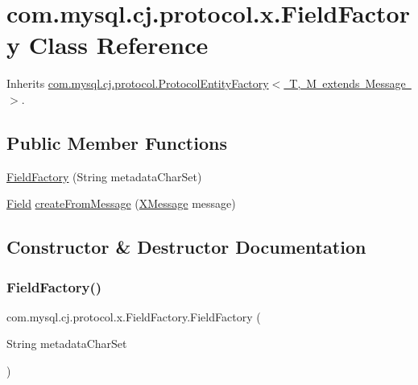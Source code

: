 \hypertarget{classcom_1_1mysql_1_1cj_1_1protocol_1_1x_1_1_field_factory}{}\section{com.\+mysql.\+cj.\+protocol.\+x.\+Field\+Factory Class Reference}
\label{classcom_1_1mysql_1_1cj_1_1protocol_1_1x_1_1_field_factory}


Inherits \mbox{\hyperlink{interfacecom_1_1mysql_1_1cj_1_1protocol_1_1_protocol_entity_factory}{com.\+mysql.\+cj.\+protocol.\+Protocol\+Entity\+Factory$<$ T, M extends Message $>$}}.

\subsection*{Public Member Functions}
\begin{DoxyCompactItemize}
\item 
\mbox{\hyperlink{classcom_1_1mysql_1_1cj_1_1protocol_1_1x_1_1_field_factory_a8139a4444bec551fb3c51df682202f7b}{Field\+Factory}} (String metadata\+Char\+Set)
\item 
\mbox{\hyperlink{classcom_1_1mysql_1_1cj_1_1result_1_1_field}{Field}} \mbox{\hyperlink{classcom_1_1mysql_1_1cj_1_1protocol_1_1x_1_1_field_factory_a931d4f5d7b65057a295f9e2ba8233986}{create\+From\+Message}} (\mbox{\hyperlink{classcom_1_1mysql_1_1cj_1_1protocol_1_1x_1_1_x_message}{X\+Message}} message)
\end{DoxyCompactItemize}


\subsection{Constructor \& Destructor Documentation}
\mbox{\label{classcom_1_1mysql_1_1cj_1_1protocol_1_1x_1_1_field_factory_a8139a4444bec551fb3c51df682202f7b}} 
\subsubsection{\texorpdfstring{Field\+Factory()}{FieldFactory()}}
{\footnotesize\ttfamily com.\+mysql.\+cj.\+protocol.\+x.\+Field\+Factory.\+Field\+Factory (\begin{DoxyParamCaption}\item[{String}]{metadata\+Char\+Set }\end{DoxyParamCaption})}



